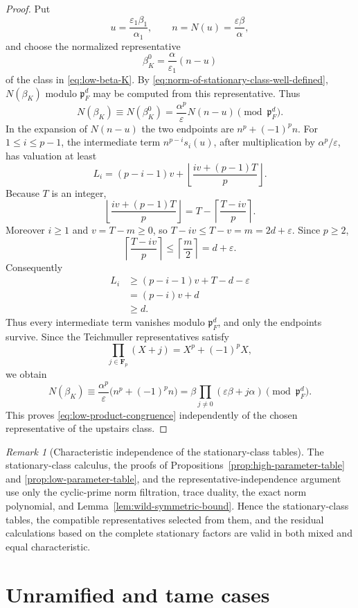 \documentclass[11pt]{amsart}
\theoremstyle{definition}
\theoremstyle{remark}
\newtheorem{remark}[theorem]{Remark}
\newcommand{\F}{\mathbf F}
\newcommand{\p}{\mathfrak p}
\begin{document}
\begin{proof}
Put
\[
 u=\frac{\varepsilon_1\beta_1}{\alpha_1},
 \qquad n=N(u)=\frac{\varepsilon\beta}{\alpha},
\]
and choose the normalized representative
\[
 \beta_K^0=\frac{\alpha}{\varepsilon_1}(n-u)
\]
of the class in \eqref{eq:low-beta-K}.  By
\eqref{eq:norm-of-stationary-class-well-defined}, $N(\beta_K)$ modulo
$\p_F^d$ may be computed from this representative.  Thus
\[
 N(\beta_K)\equiv N(\beta_K^0)
 =\frac{\alpha^p}{\varepsilon}N(n-u)\pmod{\p_F^d}.
\]
In the expansion of $N(n-u)$ the two endpoints are
$n^p+(-1)^pn$.  For $1\le i\le p-1$, the intermediate term
$n^{p-i}s_i(u)$, after multiplication by
$\alpha^p/\varepsilon$, has valuation at least
\[
 L_i=(p-i-1)v+
 \left\lfloor\frac{iv+(p-1)T}{p}\right\rfloor.
\]
Because $T$ is an integer,
\[
 \left\lfloor\frac{iv+(p-1)T}{p}\right\rfloor
 =T-\left\lceil\frac{T-iv}{p}\right\rceil.
\]
Moreover $i\ge1$ and $v=T-m\ge0$, so
$T-iv\le T-v=m=2d+\varepsilon$.  Since $p\ge2$,
\[
 \left\lceil\frac{T-iv}{p}\right\rceil
 \le\left\lceil\frac m2\right\rceil=d+\varepsilon.
\]
Consequently
\[
 \begin{aligned}
 L_i
 &\ge(p-i-1)v+T-d-\varepsilon\\
 &=(p-i)v+d\\
 &\ge d.
 \end{aligned}
\]
Thus every intermediate term vanishes modulo $\p_F^d$, and only the
endpoints survive.  Since the Teichmuller representatives satisfy
\[
 \prod_{j\in\F_p}(X+j)=X^p+(-1)^pX,
\]
we obtain
\[
 N(\beta_K)\equiv
 \frac{\alpha^p}{\varepsilon}\bigl(n^p+(-1)^pn\bigr)
 =\beta\prod_{j\ne0}(\varepsilon\beta+j\alpha)
 \pmod{\p_F^d}.
\]
This proves \eqref{eq:low-product-congruence} independently of the
chosen representative of the upstairs class.
\end{proof}

\begin{remark}[Characteristic independence of the stationary-class tables]
The stationary-class calculus, the proofs of
Propositions~\ref{prop:high-parameter-table} and
\ref{prop:low-parameter-table}, and the representative-independence
argument use only the cyclic-prime norm filtration, trace duality, the
exact norm polynomial, and Lemma~\ref{lem:wild-symmetric-bound}.
Hence the stationary-class tables, the compatible representatives
selected from them, and the residual calculations based on the complete
stationary factors are valid in both mixed and equal characteristic.
\end{remark}

\section{Unramified and tame cases}
\end{document}
